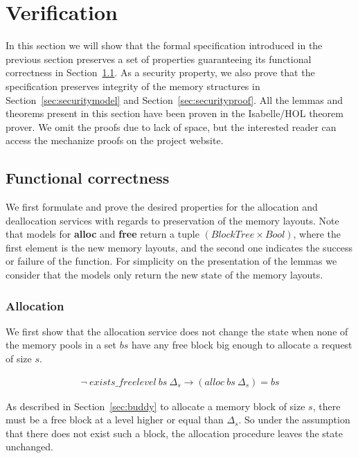 \section{Verification}
In this section we will show that the formal specification introduced in the previous section preserves a set of properties guaranteeing its functional correctness in Section~\ref{sec:functional}. As a security property, we also prove that the specification preserves integrity of the memory structures in Section~\ref{sec:securitymodel} and Section~\ref{sec:securityproof}. All the lemmas and theorems present in this section have been proven in the Isabelle/HOL theorem prover. We omit the proofs due to lack of space, but the interested reader can access the mechanize proofs on the project website.

\subsection{Functional correctness}\label{sec:functional}
We first formulate and prove the desired properties for the allocation and deallocation services with regards to preservation of the memory layouts. Note that models for \textbf{alloc} and \textbf{free} return a tuple $(BlockTree \times Bool)$, where the first element is the new memory layouts, and the second one indicates the success or failure of the function. For simplicity on the presentation of the lemmas we consider that the models only return the new state of the memory layouts.

\subsubsection{Allocation}\label{sec:functionalalloc}
We first show that the allocation service does not change the state when none of the memory pools in a set $bs$ have any free block big enough to allocate a request of size $s$. 

\begin{lemma} 
\label{lemma:no_free_space}
\begin{align*}
\neg\ exists\_freelevel\ bs\ \Delta_s \longrightarrow (alloc\ bs\ \Delta_s) = bs
\end{align*}
\end{lemma}

As described in Section~\ref{sec:buddy} to allocate a memory block of size $s$, there must be a free block at a level higher or equal than $\Delta_s$. So under the assumption that there does not exist such a block, the allocation procedure leaves the state unchanged.

